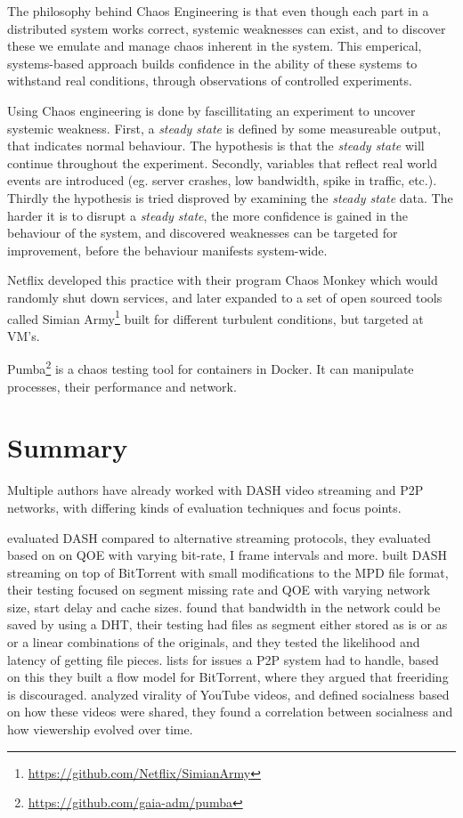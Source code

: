 The philosophy behind Chaos Engineering is that even though each part in a distributed system works correct, systemic weaknesses can exist, and to discover these we emulate and manage chaos inherent in the system. This emperical, systems-based approach builds confidence in the ability of these systems to withstand real conditions, through observations of controlled experiments.

Using Chaos engineering is done by fascillitating an experiment to uncover systemic weakness.
First, a \emph{steady state} is defined by some measureable output, that indicates normal behaviour. The hypothesis is that the \emph{steady state} will continue throughout the experiment.
Secondly, variables that reflect real world events are introduced (eg. server crashes, low bandwidth, spike in traffic, etc.).
Thirdly the hypothesis is tried disproved by examining the \emph{steady state} data.
The harder it is to disrupt a \emph{steady state}, the more confidence is gained in the behaviour of the system, and discovered weaknesses can be targeted for improvement, before the behaviour manifests system-wide.

Netflix developed this practice with their program Chaos Monkey which would randomly shut down services, and later expanded to a set of open sourced tools called Simian Army\footnote{\url{https://github.com/Netflix/SimianArmy}} built for different turbulent conditions, but targeted at \ac{VM}'s.

Pumba\footnote{\url{https://github.com/gaia-adm/pumba}} is a chaos testing tool for containers in Docker. It can manipulate processes, their performance and network.

\section{Summary}
Multiple authors have already worked with \ac{DASH} video streaming and \ac{P2P} networks, with differing kinds of evaluation techniques and focus points.

\citet{aloman2015performance} evaluated \ac{DASH} compared to alternative streaming protocols, they evaluated based on on \ac{QOE} with varying bit-rate, I frame intervals and more. \citet{gazdar2017toward} built \ac{DASH} streaming on top of BitTorrent with small modifications to the \ac{MPD} file format, their testing focused on segment missing rate and \ac{QOE} with varying network size, start delay and cache sizes. \citet{nguyen2009p2p} found that bandwidth in the network could be saved by using a \ac{DHT}, their testing had files as segment either stored as is or as or a linear combinations of the originals, and they tested the likelihood and latency of getting file pieces. \citet{qiu2004modeling} lists for issues a \ac{P2P} system had to handle, based on this they built a flow model for BitTorrent, where they argued that freeriding is discouraged. \citet{broxton2013catching} analyzed virality of YouTube videos, and defined socialness based on how these videos were shared, they found a correlation between socialness and how viewership evolved over time.

